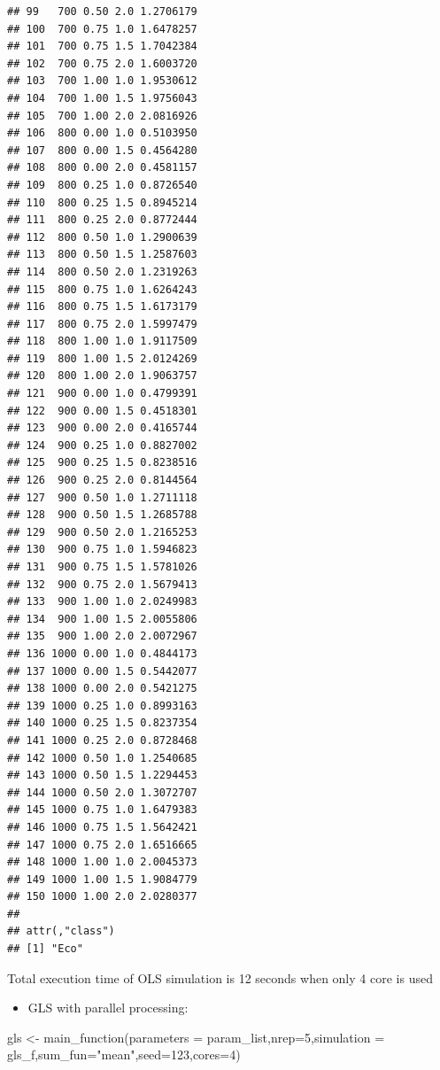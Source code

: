 \documentclass[11pt,a4paper]{article}
\newenvironment{Shaded}{\begin{snugshade}}{\end{snugshade}}
\newcommand{\AttributeTok}[1]{\textcolor[rgb]{0.77,0.63,0.00}{#1}}
\newcommand{\DecValTok}[1]{\textcolor[rgb]{0.00,0.00,0.81}{#1}}
\newcommand{\FunctionTok}[1]{\textcolor[rgb]{0.00,0.00,0.00}{#1}}
\newcommand{\NormalTok}[1]{#1}
\newcommand{\OtherTok}[1]{\textcolor[rgb]{0.56,0.35,0.01}{#1}}
\newcommand{\StringTok}[1]{\textcolor[rgb]{0.31,0.60,0.02}{#1}}
\begin{document}
\begin{verbatim}
## 99   700 0.50 2.0 1.2706179
## 100  700 0.75 1.0 1.6478257
## 101  700 0.75 1.5 1.7042384
## 102  700 0.75 2.0 1.6003720
## 103  700 1.00 1.0 1.9530612
## 104  700 1.00 1.5 1.9756043
## 105  700 1.00 2.0 2.0816926
## 106  800 0.00 1.0 0.5103950
## 107  800 0.00 1.5 0.4564280
## 108  800 0.00 2.0 0.4581157
## 109  800 0.25 1.0 0.8726540
## 110  800 0.25 1.5 0.8945214
## 111  800 0.25 2.0 0.8772444
## 112  800 0.50 1.0 1.2900639
## 113  800 0.50 1.5 1.2587603
## 114  800 0.50 2.0 1.2319263
## 115  800 0.75 1.0 1.6264243
## 116  800 0.75 1.5 1.6173179
## 117  800 0.75 2.0 1.5997479
## 118  800 1.00 1.0 1.9117509
## 119  800 1.00 1.5 2.0124269
## 120  800 1.00 2.0 1.9063757
## 121  900 0.00 1.0 0.4799391
## 122  900 0.00 1.5 0.4518301
## 123  900 0.00 2.0 0.4165744
## 124  900 0.25 1.0 0.8827002
## 125  900 0.25 1.5 0.8238516
## 126  900 0.25 2.0 0.8144564
## 127  900 0.50 1.0 1.2711118
## 128  900 0.50 1.5 1.2685788
## 129  900 0.50 2.0 1.2165253
## 130  900 0.75 1.0 1.5946823
## 131  900 0.75 1.5 1.5781026
## 132  900 0.75 2.0 1.5679413
## 133  900 1.00 1.0 2.0249983
## 134  900 1.00 1.5 2.0055806
## 135  900 1.00 2.0 2.0072967
## 136 1000 0.00 1.0 0.4844173
## 137 1000 0.00 1.5 0.5442077
## 138 1000 0.00 2.0 0.5421275
## 139 1000 0.25 1.0 0.8993163
## 140 1000 0.25 1.5 0.8237354
## 141 1000 0.25 2.0 0.8728468
## 142 1000 0.50 1.0 1.2540685
## 143 1000 0.50 1.5 1.2294453
## 144 1000 0.50 2.0 1.3072707
## 145 1000 0.75 1.0 1.6479383
## 146 1000 0.75 1.5 1.5642421
## 147 1000 0.75 2.0 1.6516665
## 148 1000 1.00 1.0 2.0045373
## 149 1000 1.00 1.5 1.9084779
## 150 1000 1.00 2.0 2.0280377
## 
## attr(,"class")
## [1] "Eco"
\end{verbatim}

Total execution time of OLS simulation is 12 seconds when only 4 core is
used

\begin{itemize}

\item
  GLS with parallel processing:
\end{itemize}

\begin{Shaded}
\begin{Highlighting}[]
\NormalTok{gls }\OtherTok{\textless{}{-}} \FunctionTok{main\_function}\NormalTok{(}\AttributeTok{parameters =}\NormalTok{ param\_list,}\AttributeTok{nrep=}\DecValTok{5}\NormalTok{,}\AttributeTok{simulation =}\NormalTok{ gls\_f,}\AttributeTok{sum\_fun=}\StringTok{"mean"}\NormalTok{,}\AttributeTok{seed=}\DecValTok{123}\NormalTok{,}\AttributeTok{cores=}\DecValTok{4}\NormalTok{)}
\end{Highlighting}
\end{Shaded}
\end{document}
